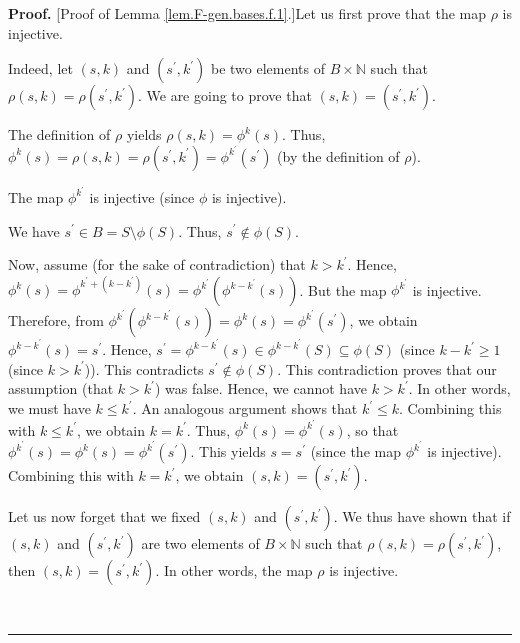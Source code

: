 \documentclass[numbers=enddot,12pt,final,onecolumn,notitlepage]{scrartcl}%
\theoremstyle{definition}
\newenvironment{proof}[1][Proof]{\noindent\textbf{#1.} }{\ \rule{0.5em}{0.5em}}
\begin{document}
\begin{proof}
[Proof of Lemma \ref{lem.F-gen.bases.f.1}.]Let us first prove that the map
$\rho$ is injective.

Indeed, let $\left(  s,k\right)  $ and $\left(  s^{\prime},k^{\prime}\right)
$ be two elements of $B\times\mathbb{N}$ such that $\rho\left(  s,k\right)
=\rho\left(  s^{\prime},k^{\prime}\right)  $. We are going to prove that
$\left(  s,k\right)  =\left(  s^{\prime},k^{\prime}\right)  $.

The definition of $\rho$ yields $\rho\left(  s,k\right)  =\phi^{k}\left(
s\right)  $. Thus, $\phi^{k}\left(  s\right)  =\rho\left(  s,k\right)
=\rho\left(  s^{\prime},k^{\prime}\right)  =\phi^{k^{\prime}}\left(
s^{\prime}\right)  $ (by the definition of $\rho$).

The map $\phi^{k^{\prime}}$ is injective (since $\phi$ is injective).

We have $s^{\prime}\in B=S\setminus\phi\left(  S\right)  $. Thus, $s^{\prime
}\notin\phi\left(  S\right)  $.

Now, assume (for the sake of contradiction) that $k>k^{\prime}$. Hence,
$\phi^{k}\left(  s\right)  =\phi^{k^{\prime}+\left(  k-k^{\prime}\right)
}\left(  s\right)  =\phi^{k^{\prime}}\left(  \phi^{k-k^{\prime}}\left(
s\right)  \right)  $. But the map $\phi^{k^{\prime}}$ is injective. Therefore,
from $\phi^{k^{\prime}}\left(  \phi^{k-k^{\prime}}\left(  s\right)  \right)
=\phi^{k}\left(  s\right)  =\phi^{k^{\prime}}\left(  s^{\prime}\right)  $, we
obtain $\phi^{k-k^{\prime}}\left(  s\right)  =s^{\prime}$. Hence, $s^{\prime
}=\phi^{k-k^{\prime}}\left(  s\right)  \in\phi^{k-k^{\prime}}\left(  S\right)
\subseteq\phi\left(  S\right)  $ (since $k-k^{\prime}\geq1$ (since
$k>k^{\prime}$)). This contradicts $s^{\prime}\notin\phi\left(  S\right)  $.
This contradiction proves that our assumption (that $k>k^{\prime}$) was false.
Hence, we cannot have $k>k^{\prime}$. In other words, we must have $k\leq
k^{\prime}$. An analogous argument shows that $k^{\prime}\leq k$. Combining
this with $k\leq k^{\prime}$, we obtain $k=k^{\prime}$. Thus, $\phi^{k}\left(
s\right)  =\phi^{k^{\prime}}\left(  s\right)  $, so that $\phi^{k^{\prime}%
}\left(  s\right)  =\phi^{k}\left(  s\right)  =\phi^{k^{\prime}}\left(
s^{\prime}\right)  $. This yields $s=s^{\prime}$ (since the map $\phi
^{k^{\prime}}$ is injective). Combining this with $k=k^{\prime}$, we obtain
$\left(  s,k\right)  =\left(  s^{\prime},k^{\prime}\right)  $.

Let us now forget that we fixed $\left(  s,k\right)  $ and $\left(  s^{\prime
},k^{\prime}\right)  $. We thus have shown that if $\left(  s,k\right)  $ and
$\left(  s^{\prime},k^{\prime}\right)  $ are two elements of $B\times
\mathbb{N}$ such that $\rho\left(  s,k\right)  =\rho\left(  s^{\prime
},k^{\prime}\right)  $, then $\left(  s,k\right)  =\left(  s^{\prime
},k^{\prime}\right)  $. In other words, the map $\rho$ is injective.


\end{proof}
\end{document}
